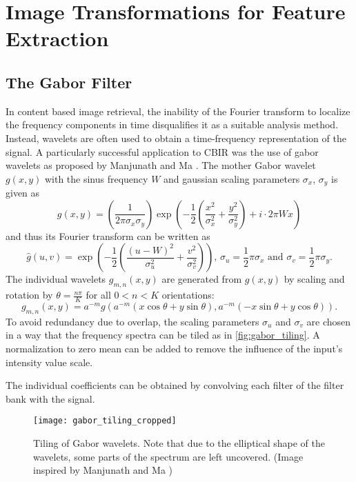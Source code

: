 \section{Image Transformations for Feature Extraction}

\subsection{The Gabor Filter}

In content based image retrieval, the inability of the Fourier transform to
localize the frequency components in time disqualifies it as a suitable
analysis method. Instead, wavelets are often used to obtain a time-frequency
representation of the signal. A particularly successful application to CBIR was
the use of gabor wavelets as proposed by Manjunath and Ma
\autocite{manjunath_texture_1996}. The mother Gabor wavelet $g(x, y)$ with the
sinus frequency $W$ and gaussian scaling parameters $\sigma_x$, $\sigma_y$ is
given as
\begin{equation*}
    g(x, y) = \left( \frac{1}{2 \pi \sigma_x \sigma_y} \right) \exp{\left( - \frac{1}{2} \left( \frac{x^2}{\sigma_x^2} + \frac{y^2}{\sigma_y^2} \right) + i \cdot 2 \pi W x \right)}
\end{equation*}
and thus its Fourier transform can be written as
\begin{equation*}
    \hat{g}(u, v) = \exp{\left( - \frac{1}{2} \left( \frac{(u - W)^2}{\sigma_u^2} + \frac{v^2}{\sigma_v^2} \right) \right)}\text{, }
    \sigma_u = \frac{1}{2} \pi \sigma_x \text{ and } \sigma_v = \frac{1}{2} \pi \sigma_y.
\end{equation*}
The individual wavelets $g_{m, n}(x, y)$ are generated from $g(x, y)$ by
scaling and rotation by $\theta = \frac{n \pi}{K}$ for all $0 < n < K$
orientations:
\begin{equation*}
    g_{m, n}(x, y) = a^{-m} g \left( a^{-m} (x \cos{\theta} + y \sin{\theta}), a^{-m} (-x \sin{\theta} + y \cos{\theta}) \right).
\end{equation*}
To avoid redundancy due to overlap, the scaling parameters $\sigma_u$ and
$\sigma_v$ are chosen in a way that the frequency spectra can be tiled as in
\autoref{fig:gabor_tiling}. A normalization to zero mean can be added to remove
the influence of the input's intensity value scale.

The individual coefficients can be obtained by convolving each filter of the
filter bank with the signal.

\begin{figure}[h]
    \centering
        \texttt{[image: gabor\_tiling\_cropped]}
    \caption[Tiling of Gabor wavelets]{
        Tiling of Gabor wavelets. Note that due to the elliptical shape of the
        wavelets, some parts of the spectrum are left uncovered. (Image
        inspired by Manjunath and Ma \autocite{manjunath_texture_1996})
        }
    \label{fig:gabor_tiling}
\end{figure}

